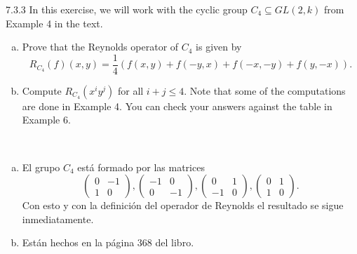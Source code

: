 \documentclass[twoside]{article}
\begin{document}
\begin{ejercicio}{7.3.3}
In this exercise, we will work with the cyclic group $C_4 ⊆ GL(2, k)$ from Example 4 in
the text.
\begin{enumerate}[a.]
\item Prove that the Reynolds operator of $C_4$ is given by
\[
R_{C_4} ( f )(x, y) =
\frac{1}{4}
( f (x, y) + f (−y, x) +f (−x,−y) + f (y,−x)).
\]
\item Compute $R_{C_4}(x^iy^j)$ for all $i + j ≤ 4$. Note that some of the computations are done in
Example 4. You can check your answers against the table in Example 6.
\end{enumerate}
\end{ejercicio}
\begin{solucion}\
\begin{enumerate}[a.]
\item El grupo $C_4$ está formado por las matrices
\[
\begin{pmatrix}
0 & -1\\
1 & 0
\end{pmatrix}, \begin{pmatrix}
-1 & 0\\
0 & -1
\end{pmatrix},\begin{pmatrix}
0 & 1\\
-1 & 0
\end{pmatrix}, \begin{pmatrix}
0 & 1\\
1 & 0
\end{pmatrix}.
\]
Con esto y con la definición del operador de Reynolds el resultado se sigue inmediatamente.
\item Están hechos en la página 368 del libro.
\end{enumerate}

\end{solucion}


\newpage
\end{document}
